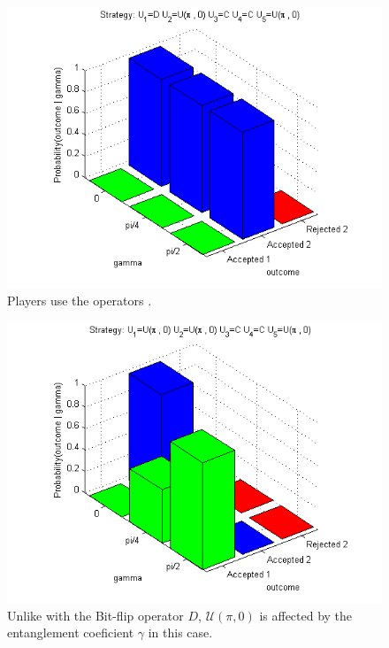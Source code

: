 \begin{figure}[h]
\centering 
\includegraphics[scale=0.80]{Figures/1.5qubit/DUpi0CCUpi0.png}
\caption{Players use the operators . }
\label{fig:pg_3players_99_0_1:2}
\end{figure}

\begin{figure}[h]
\centering 
\includegraphics[scale=0.80]{Figures/1.5qubit/Upi0Upi0CCUpi0.png}
\caption{Unlike with the Bit-flip operator $D$, $\mathcal{U} (\pi, 0)$ is affected by the entanglement coeficient $\gamma$ in this case. }
\label{fig:pg_3players_99_0_1:3}
\end{figure}




























